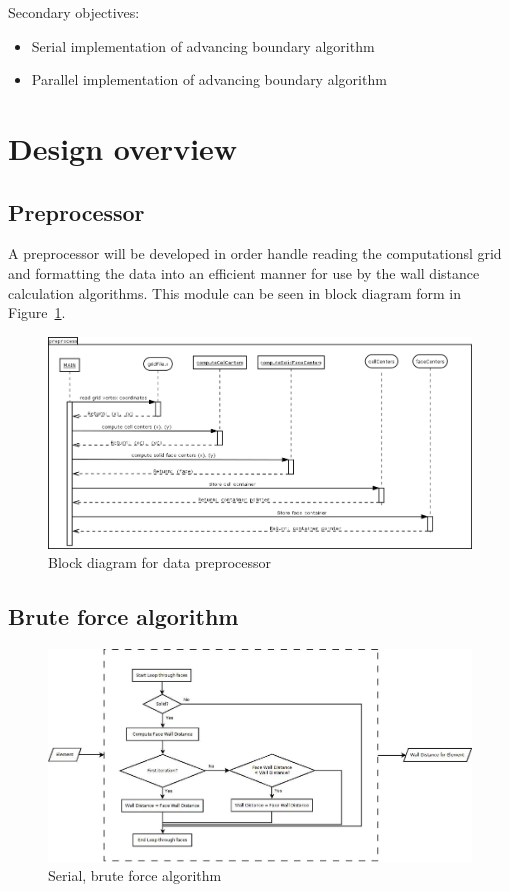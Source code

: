 \documentclass[]{aiaa-tc}%
\begin{document}
Secondary objectives:
\begin{itemize}
  \item Serial implementation of advancing boundary algorithm
  \item Parallel implementation of advancing boundary algorithm
\end{itemize}

\section{Design overview}

\subsection{Preprocessor}
A preprocessor will be developed in order handle reading the computationsl grid and
formatting the data into an efficient manner for use by the wall
distance calculation algorithms. This module can be seen in block
diagram form in Figure~\ref{f:preprocessor_block}.

\begin{figure}
  \includegraphics{figures/preprocessor/preprocessor_block}
  \caption{Block diagram for data preprocessor}
  \label{f:preprocessor_block}
\end{figure}


\subsection{Brute force algorithm}

\begin{figure}
  \includegraphics{figures/brute_force/bf_serial_block}
  \caption{Serial, brute force algorithm}
  \label{f:bf_serial}
\end{figure}
\end{document}
